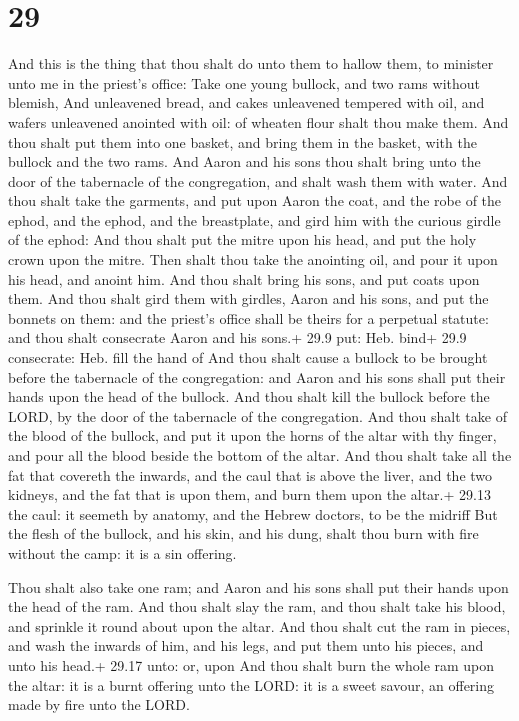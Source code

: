 \hypertarget{section-28}{%
\section{29}\label{section-28}}

 And this is the thing that thou shalt do unto them to
hallow them, to minister unto me in the priest's office: Take one young
bullock, and two rams without blemish,  And unleavened
bread, and cakes unleavened tempered with oil, and wafers unleavened
anointed with oil: of wheaten flour shalt thou make them. 
And thou shalt put them into one basket, and bring them in the basket,
with the bullock and the two rams.  And Aaron and his sons
thou shalt bring unto the door of the tabernacle of the congregation,
and shalt wash them with water.  And thou shalt take the
garments, and put upon Aaron the coat, and the robe of the ephod, and
the ephod, and the breastplate, and gird him with the curious girdle of
the ephod:  And thou shalt put the mitre upon his head, and
put the holy crown upon the mitre.  Then shalt thou take the
anointing oil, and pour it upon his head, and anoint him. 
And thou shalt bring his sons, and put coats upon them.  And
thou shalt gird them with girdles, Aaron and his sons, and put the
bonnets on them: and the priest's office shall be theirs for a perpetual
statute: and thou shalt consecrate Aaron and his sons.+ 29.9 put: Heb.
bind+ 29.9 consecrate: Heb. fill the hand of  And thou
shalt cause a bullock to be brought before the tabernacle of the
congregation: and Aaron and his sons shall put their hands upon the head
of the bullock.  And thou shalt kill the bullock before the
LORD, by the door of the tabernacle of the congregation. 
And thou shalt take of the blood of the bullock, and put it upon the
horns of the altar with thy finger, and pour all the blood beside the
bottom of the altar.  And thou shalt take all the fat that
covereth the inwards, and the caul that is above the liver, and the two
kidneys, and the fat that is upon them, and burn them upon the altar.+
29.13 the caul: it seemeth by anatomy, and the Hebrew doctors, to be the
midriff  But the flesh of the bullock, and his skin, and
his dung, shalt thou burn with fire without the camp: it is a sin
offering.

 Thou shalt also take one ram; and Aaron and his sons
shall put their hands upon the head of the ram.  And thou
shalt slay the ram, and thou shalt take his blood, and sprinkle it round
about upon the altar.  And thou shalt cut the ram in
pieces, and wash the inwards of him, and his legs, and put them unto his
pieces, and unto his head.+ 29.17 unto: or, upon  And thou
shalt burn the whole ram upon the altar: it is a burnt offering unto the
LORD: it is a sweet savour, an offering made by fire unto the LORD.

